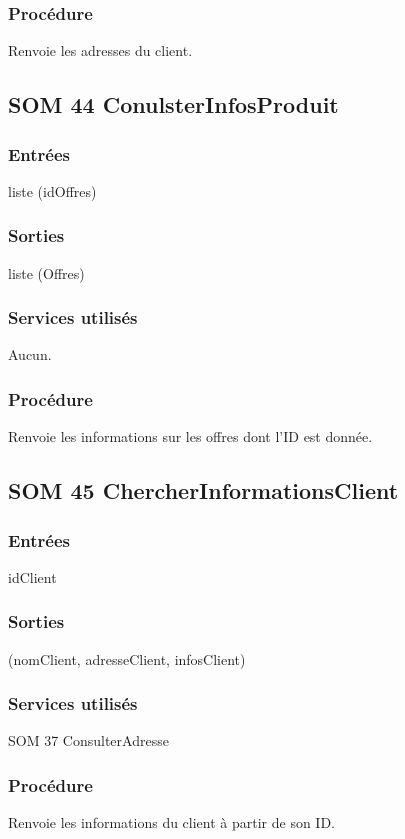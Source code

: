 \subsubsection{Procédure}
Renvoie les adresses du client.

\subsection{SOM 44 ConulsterInfosProduit}
\subsubsection{Entrées}
liste (idOffres)
\subsubsection{Sorties}
liste (Offres)
\subsubsection{Services utilisés}
Aucun.
\subsubsection{Procédure}
Renvoie les informations sur les offres dont l'ID est donnée.

\subsection{SOM 45 ChercherInformationsClient}
\subsubsection{Entrées}
idClient
\subsubsection{Sorties}
(nomClient, adresseClient, infosClient)
\subsubsection{Services utilisés}
SOM 37 ConsulterAdresse
\subsubsection{Procédure}
Renvoie les informations du client à partir de son ID.
